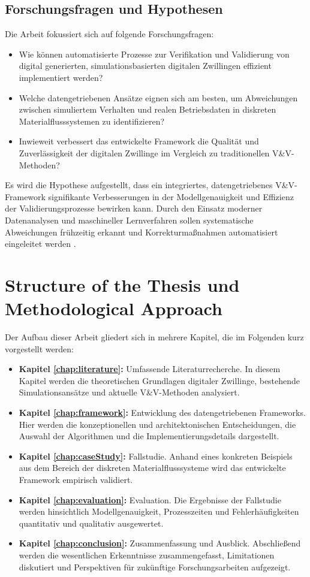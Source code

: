 \subsection*{Forschungsfragen und Hypothesen}

Die Arbeit fokussiert sich auf folgende Forschungsfragen:
\begin{itemize}
  \item Wie können automatisierte Prozesse zur Verifikation und Validierung von digital generierten, simulationsbasierten digitalen Zwillingen effizient implementiert werden?
  \item Welche datengetriebenen Ansätze eignen sich am besten, um Abweichungen zwischen simuliertem Verhalten und realen Betriebsdaten in diskreten Materialflusssystemen zu identifizieren?
  \item Inwieweit verbessert das entwickelte Framework die Qualität und Zuverlässigkeit der digitalen Zwillinge im Vergleich zu traditionellen V\&V-Methoden?
\end{itemize}

Es wird die Hypothese aufgestellt, dass ein integriertes, datengetriebenes V\&V-Framework signifikante Verbesserungen in der Modellgenauigkeit und Effizienz der Validierungsprozesse bewirken kann. Durch den Einsatz moderner Datenanalysen und maschineller Lernverfahren sollen systematische Abweichungen frühzeitig erkannt und Korrekturmaßnahmen automatisiert eingeleitet werden \parencite{Tao2018}.

\section{Structure of the Thesis und Methodological Approach}

Der Aufbau dieser Arbeit gliedert sich in mehrere Kapitel, die im Folgenden kurz vorgestellt werden:

\begin{itemize}
  \item \textbf{Kapitel \ref{chap:literature}:} Umfassende Literaturrecherche. In diesem Kapitel werden die theoretischen Grundlagen digitaler Zwillinge, bestehende Simulationsansätze und aktuelle V\&V-Methoden analysiert.
  \item \textbf{Kapitel \ref{chap:framework}:} Entwicklung des datengetriebenen Frameworks. Hier werden die konzeptionellen und architektonischen Entscheidungen, die Auswahl der Algorithmen und die Implementierungsdetails dargestellt.
  \item \textbf{Kapitel \ref{chap:caseStudy}:} Fallstudie. Anhand eines konkreten Beispiels aus dem Bereich der diskreten Materialflusssysteme wird das entwickelte Framework empirisch validiert.
  \item \textbf{Kapitel \ref{chap:evaluation}:} Evaluation. Die Ergebnisse der Fallstudie werden hinsichtlich Modellgenauigkeit, Prozesszeiten und Fehlerhäufigkeiten quantitativ und qualitativ ausgewertet.
  \item \textbf{Kapitel \ref{chap:conclusion}:} Zusammenfassung und Ausblick. Abschließend werden die wesentlichen Erkenntnisse zusammengefasst, Limitationen diskutiert und Perspektiven für zukünftige Forschungsarbeiten aufgezeigt.
\end{itemize}

